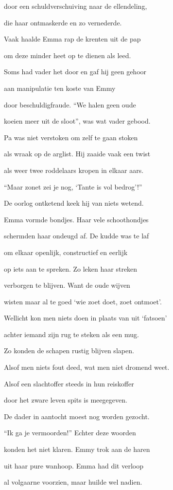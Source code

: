 door een schuldverschuiving
naar de ellendeling,

die haar ontmaskerde
en zo vernederde.

Vaak haalde Emma rap
de krenten uit de pap

om deze minder heet
op te dienen als leed.

Soms had vader het door
en gaf hij geen gehoor

aan manipulatie
ten koste van Emmy

door beschuldigfraude.
“We halen geen oude

koeien meer uit de sloot”,
was wat vader gebood.

Pa was niet verstoken
om zelf te gaan stoken

als wraak op de arglist.
Hij zaaide vaak een twist

als weer twee roddelaars
kropen in elkaar aars.

“Maar zonet zei je nog,
‘Tante is vol bedrog’!”

De oorlog ontketend
keek hij van niets wetend.

Emma vormde bondjes.
Haar vele schoothondjes

schermden haar ondeugd af.
De kudde was te laf

om elkaar openlijk,
constructief en eerlijk

op iets aan te spreken.
Zo leken haar streken

verborgen te blijven.
Want de oude wijven

wisten maar al te goed
‘wie zoet doet, zoet ontmoet’.

Wellicht kon men niets doen
in plaats van uit ‘fatsoen’

achter iemand zijn rug
te steken als een mug.

Zo konden de schapen
rustig blijven slapen.

Alsof men niets fout deed,
wat men niet dromend weet.

Alsof een slachtoffer
steeds in hun reiskoffer

door het zware leven
spits is meegegeven.

De dader in aantocht
moest nog worden gezocht.

“Ik ga je vermoorden!”
Echter deze woorden

konden het niet klaren.
Emmy trok aan de haren

uit haar pure wanhoop.
Emma had dit verloop

al volgaarne voorzien,
maar huilde wel nadien.

